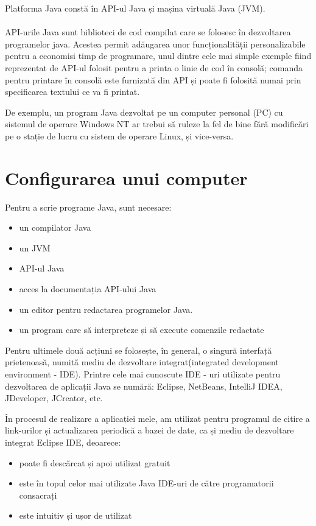 Platforma Java constă în API-ul Java și mașina virtuală Java (JVM).

\paragraph{ }API-urile Java sunt biblioteci de cod compilat care se folosesc în dezvoltarea programelor java. Acestea permit adăugarea unor funcționalității personalizabile pentru a economisi timp de programare, unul dintre cele mai simple exemple fiind reprezentat de API-ul folosit pentru a printa o linie de cod în consolă; comanda pentru printare în consolă este furnizată din API și poate fi folosită numai prin specificarea textului ce va fi printat. \newline

De exemplu, un program Java dezvoltat pe un computer personal (PC) cu sistemul de operare Windows NT ar trebui să ruleze la fel de bine fără modificări pe o stație de lucru cu sistem de operare Linux, și vice-versa.\cite{10}\newline 

\section{Configurarea unui computer}

Pentru a scrie programe Java, sunt necesare:
\begin{itemize}
  \item un compilator Java
	\item un JVM
	\item API-ul Java
	\item acces la documentația API-ului Java
	\item un editor pentru redactarea programelor Java.
	\item un program care să interpreteze și să execute comenzile redactate 
\end{itemize}
Pentru ultimele două acțiuni se folosește, în general, o singură interfață prietenoasă, numită mediu de dezvoltare integrat(integrated development environment - IDE).
Printre cele mai cunoscute IDE - uri utilizate pentru dezvoltarea de aplicații Java se numără: Eclipse, NetBeans, IntelliJ IDEA, JDeveloper, JCreator, etc.\newpage

În procesul de realizare a aplicației mele, am utilizat pentru programul de citire a link-urilor și actualizarea periodică a bazei de date,  ca și mediu de dezvoltare integrat Eclipse IDE, deoarece:\newline
\begin{itemize}
	\item poate fi descărcat și apoi utilizat gratuit
	\item este în topul celor mai utilizate Java IDE-uri de către programatorii consacrați
	\item este intuitiv și ușor de utilizat
\end{itemize}
